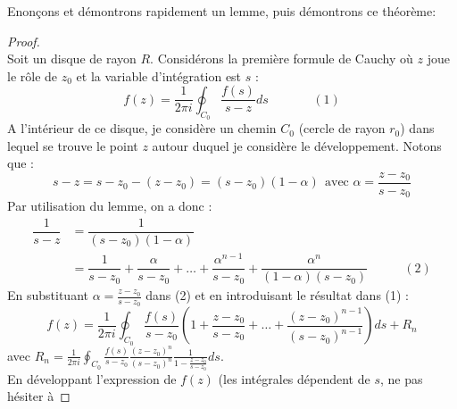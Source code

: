 Enonçons et démontrons rapidement un lemme, puis démontrons ce théorème:\\
	
	
\begin{proof}\ \\
	Soit un disque de rayon $R$. Considérons la première formule de Cauchy où $z$ joue le rôle 
	de $z_0$ et la variable d'intégration est $s$ :
	\begin{equation}
		f(z) = \frac{1}{2\pi i}\oint_{C_0} \frac{f(s)}{s-z}ds\ \ \ \ \ \ \  \ \ \ \ \ \ \ \ \ (1)
	\end{equation}
	A l'intérieur de ce disque, je considère un chemin $C_0$ (cercle de rayon $r_0$) dans lequel
	se trouve le point $z$ autour duquel je considère le développement. Notons que :
	\begin{equation}
		s-z = s-z_0-(z-z_0) = (s-z_0)(1-\alpha)\ \ \text{avec } \alpha = \frac{z-z_0}{s-z_0}
	\end{equation}
	Par utilisation du lemme, on a donc :
	\begin{equation}
		\begin{array}{ll}
			\dfrac{1}{s-z} & = \dfrac{1}{(s-z_0)(1-\alpha)}                                                               \\
			               & = \dfrac{1}{s-z_0}+\dfrac{\alpha}{s-z_0}+\dots+\dfrac{\alpha^{n-1}}{s-z_0}+\dfrac{\alpha^n}{ 
			(1-\alpha)(s-z_0)} \ \ \ \ \ \ \ \ \ \ \ \ \ (2)
		\end{array}
	\end{equation}
	En substituant $\alpha = \frac{z-z_0}{s-z_0}$ dans (2) et en introduisant le résultat dans
	(1) :
	\begin{equation}
		f(z) = \frac{1}{2\pi i}\oint_{C_0} \frac{f(s)}{s-z_0}\left(1 + \dfrac{z-z_0}{s-z_0} + \dots +
		\dfrac{(z-z_0)^{n-1}}{(s-z_0)^{n-1}}\right)ds + R_n
	\end{equation}
	avec $R_n = \frac{1}{2\pi i}\oint_{C_0} \frac{f(s)}{s-z_0}\frac{(z-z_0)^n}{(s-z_0)^n}\frac{
		1}{1-\frac{z-z_0}{s-z_0}}ds$.\\
	En développant l'expression de $f(z)$ (les intégrales dépendent de $s$, ne pas hésiter à 

\end{proof}
